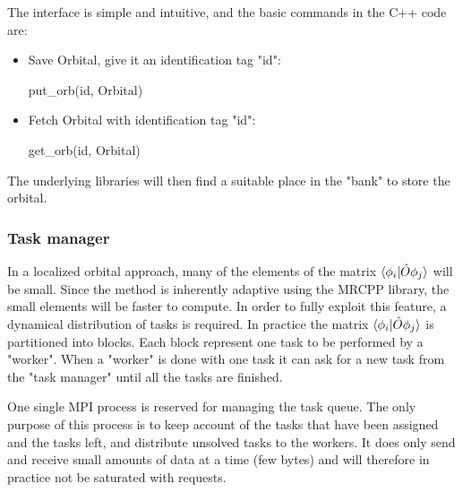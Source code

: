 \documentclass{article}
\begin{document}
The interface is simple and intuitive, and the basic commands in the C++ code are:
\begin{itemize}
    \item Save Orbital, give it an identification tag "id": 
    
put\_orb(id, Orbital)
\item Fetch Orbital with  identification tag "id": 

get\_orb(id, Orbital)

\end{itemize}


The underlying libraries will then find a suitable place in the "bank" to store the orbital.


\subsubsection{Task manager} 
In a localized orbital approach, many of the elements of the matrix $\braket{\phi_i|{\hat O} \phi_j}$ will be small. Since the method is inherently adaptive using the MRCPP library, the small elements will be faster to compute. In order to fully exploit this feature, a dynamical distribution of tasks is required.  
In practice the matrix $\braket{\phi_i|{\hat O} \phi_j}$ is partitioned into blocks. Each block represent one task to be performed by a "worker". When a "worker" is done with one task it can ask for a new task from the "task manager" until all the tasks are finished.

One single MPI process is reserved for managing the task queue. The only purpose of this process is to keep account of the tasks that have been assigned and the tasks left, and distribute unsolved tasks to the workers. It does only send and receive small amounts of data at a time (few bytes) and will therefore in practice not be saturated with requests.



\end{document}
